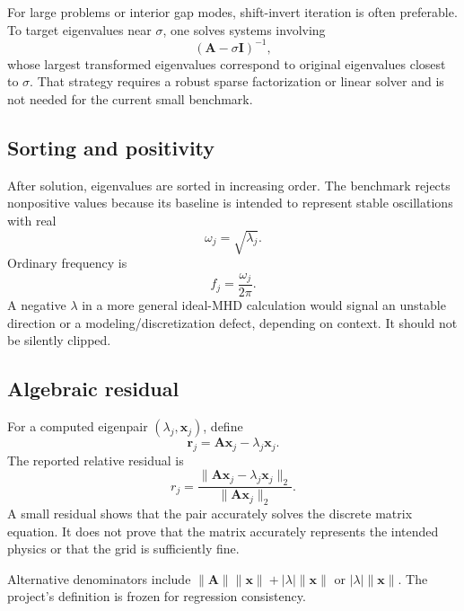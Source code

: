 For large problems or interior gap modes, shift-invert iteration is often preferable. To target eigenvalues near $\sigma$, one solves systems involving
\begin{equation}
(\mathbf A-\sigma\mathbf I)^{-1},
\end{equation}
whose largest transformed eigenvalues correspond to original eigenvalues closest to $\sigma$. That strategy requires a robust sparse factorization or linear solver and is not needed for the current small benchmark.

\subsection{Sorting and positivity}
After solution, eigenvalues are sorted in increasing order. The benchmark rejects nonpositive values because its baseline is intended to represent stable oscillations with real
\begin{equation}
\omega_j=\sqrt{\lambda_j}.
\end{equation}
Ordinary frequency is
\begin{equation}
f_j=\frac{\omega_j}{2\pi}.
\end{equation}
A negative $\lambda$ in a more general ideal-MHD calculation would signal an unstable direction or a modeling/discretization defect, depending on context. It should not be silently clipped.

\subsection{Algebraic residual}
For a computed eigenpair $(\lambda_j,\mathbf x_j)$, define
\begin{equation}
\mathbf r_j=\mathbf A\mathbf x_j-\lambda_j\mathbf x_j.
\end{equation}
The reported relative residual is
\begin{equation}
\boxed{
r_j=\frac{\|\mathbf A\mathbf x_j-\lambda_j\mathbf x_j\|_2}
{\|\mathbf A\mathbf x_j\|_2}.}
\label{eq:relative_eigen_residual}
\end{equation}
A small residual shows that the pair accurately solves the discrete matrix equation. It does not prove that the matrix accurately represents the intended physics or that the grid is sufficiently fine.

Alternative denominators include $\|\mathbf A\|\|\mathbf x\|+|\lambda|\|\mathbf x\|$ or $|\lambda|\|\mathbf x\|$. The project's definition is frozen for regression consistency.

